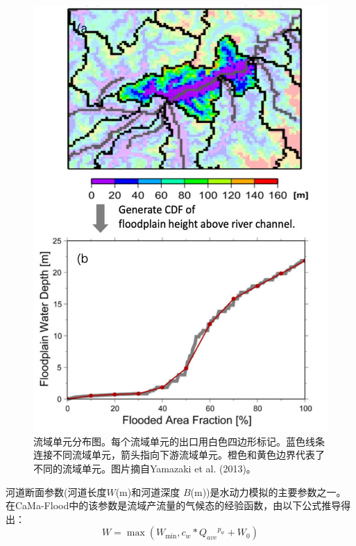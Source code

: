{
\begin{figure}[]
\centering
\includegraphics{Figures/基础数据/CaMa-Flood基于流域单元的漫滩高程剖面函数.png}
\caption{流域单元分布图。每个流域单元的出口用白色四边形标记。蓝色线条连接不同流域单元，箭头指向下游流域单元。橙色和黄色边界代表了不同的流域单元。图片摘自Yamazaki et al. (2013)。}
\label{fig:CaMa-Flood基于流域单元的漫滩高程剖面函数}
\end{figure}
}



河道断面参数(河道长度$W$(m)和河道深度 $B$(m))是水动力模拟的主要参数之一。在CaMa-Flood中的该参数是流域产流量的气候态的经验函数，由以下公式推导得出：
\begin{equation}
W=\max \left(W_{\min }, c_{w} * {Q_{a v e}}^{p_{w}}+W_{0}\right)
\end{equation}

